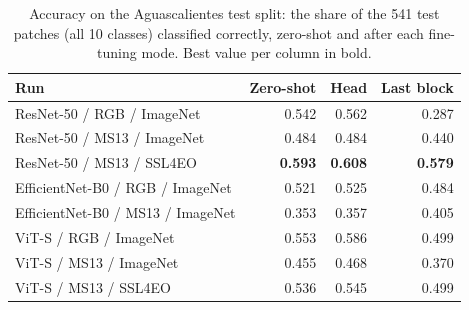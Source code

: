 \begin{table}[t]
\centering
\footnotesize
\caption{Accuracy on the Aguascalientes test split: the share of the 541 test patches (all 10 classes) classified correctly, zero-shot and after each fine-tuning mode. Best value per column in bold.}
\label{tab:ags_accuracy}
\begin{tabular}{lrrr}
\toprule
Run & Zero-shot & Head & Last block \\
\midrule
ResNet-50 / RGB / ImageNet & 0.542 & 0.562 & 0.287 \\
ResNet-50 / MS13 / ImageNet & 0.484 & 0.484 & 0.440 \\
ResNet-50 / MS13 / SSL4EO & \textbf{0.593} & \textbf{0.608} & \textbf{0.579} \\
EfficientNet-B0 / RGB / ImageNet & 0.521 & 0.525 & 0.484 \\
EfficientNet-B0 / MS13 / ImageNet & 0.353 & 0.357 & 0.405 \\
ViT-S / RGB / ImageNet & 0.553 & 0.586 & 0.499 \\
ViT-S / MS13 / ImageNet & 0.455 & 0.468 & 0.370 \\
ViT-S / MS13 / SSL4EO & 0.536 & 0.545 & 0.499 \\
\bottomrule
\end{tabular}
\end{table}
